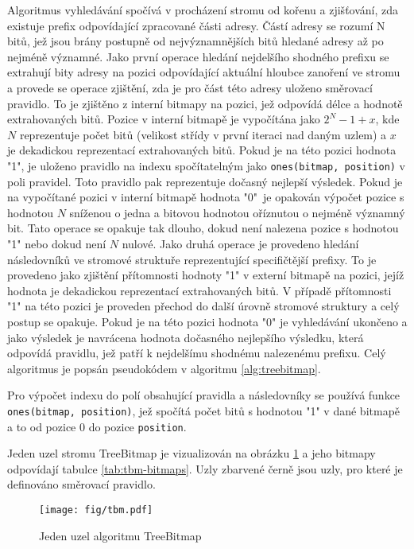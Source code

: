 Algoritmus vyhledávání spočívá v procházení stromu od kořenu a zjišťování, zda
existuje prefix odpovídající zpracované části adresy. Částí adresy se rozumí N bitů, jež jsou brány postupně
od nejvýznamnějších bitů hledané adresy až po nejméně významné.
Jako první operace hledání nejdelšího shodného prefixu se extrahují bity adresy na pozici odpovídající
aktuální hloubce zanoření ve stromu a provede se operace zjištění, zda je pro část této adresy uloženo
směrovací pravidlo. To je zjištěno z interní bitmapy na pozici, jež odpovídá délce a hodnotě extrahovaných bitů.
Pozice v interní bitmapě je vypočítána jako $2^{N} - 1 + x$, kde $N$ reprezentuje počet bitů (velikost střídy v první iteraci nad daným uzlem) a $x$
je dekadickou reprezentací extrahovaných bitů.
Pokud je na této pozici
hodnota "1", je uloženo pravidlo na indexu spočítatelným jako \texttt{ones(bitmap, position)} v poli pravidel.
Toto pravidlo pak reprezentuje dočasný nejlepší výsledek. Pokud je na vypočítané
pozici v interní bitmapě hodnota "0"~je opakován výpočet pozice s hodnotou $N$ sníženou o jedna a bitovou hodnotou
oříznutou o nejméně významný bit. Tato operace se opakuje tak dlouho, dokud není nalezena pozice
s hodnotou "1"
nebo dokud není $N$ nulové. Jako druhá operace je provedeno hledání následovníků ve stromové struktuře
reprezentující specifičtější prefixy. To je provedeno jako zjištění přítomnosti hodnoty "1" v externí
bitmapě na pozici, jejíž hodnota je dekadickou reprezentací extrahovaných bitů. V případě přítomnosti
"1" na této pozici je proveden přechod do další úrovně stromové struktury a celý postup se opakuje.
Pokud je na této pozici hodnota "0" je vyhledávání ukončeno a jako výsledek je navrácena hodnota
dočasného nejlepšího výsledku, která odpovídá pravidlu, jež patří k nejdelšímu shodnému nalezenému
prefixu. Celý algoritmus je popsán pseudokódem v algoritmu \ref{alg:treebitmap}.

Pro výpočet indexu do polí obsahující pravidla a následovníky se používá funkce
\texttt{ones(bitmap, position)}, jež
spočítá počet bitů s hodnotou "1" v dané bitmapě a to od pozice 0 do pozice \texttt{position}.

Jeden uzel stromu TreeBitmap je vizualizován na obrázku \ref{fig:tbm-node} a jeho bitmapy odpovídají tabulce
\ref{tab:tbm-bitmaps}. Uzly zbarvené černě
jsou uzly, pro které je definováno směrovací pravidlo.

\begin{figure}[!htbp]
    \centering
    \texttt{[image: fig/tbm.pdf]}
    \caption{Jeden uzel algoritmu TreeBitmap}
    \label{fig:tbm-node}
\end{figure}

